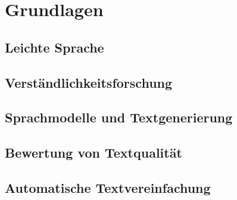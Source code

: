 
\chapter{Grundlagen}\label{ch:grundlagen}


\section{Leichte Sprache}\label{ch:leichtesprache}


\section{Verständlichkeitsforschung}


\section{Sprachmodelle und Textgenerierung}


\section{Bewertung von Textqualität}


\section{Automatische Textvereinfachung}
